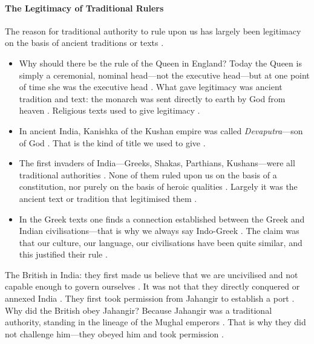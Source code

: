 \paragraph{The Legitimacy of Traditional Rulers}
The reason for traditional authority to rule upon us has largely been legitimacy on the basis of ancient traditions or texts .
\begin{itemize}
    \item Why should there be the rule of the Queen in England? Today the Queen is simply a ceremonial, nominal head---not the executive head---but at one point of time she was the executive head . What gave legitimacy was ancient tradition and text: the monarch was sent directly to earth by God from heaven . Religious texts used to give legitimacy .
    \item In ancient India, Kanishka of the Kushan empire was called \textit{Devaputra}---son of God . That is the kind of title we used to give .
    \item The first invaders of India---Greeks, Shakas, Parthians, Kushans---were all traditional authorities . None of them ruled upon us on the basis of a constitution, nor purely on the basis of heroic qualities . Largely it was the ancient text or tradition that legitimised them .
    \item In the Greek texts one finds a connection established between the Greek and Indian civilisations---that is why we always say Indo-Greek . The claim was that our culture, our language, our civilisations have been quite similar, and this justified their rule .
\end{itemize}

\begin{ExampleBox}
The British in India: they first made us believe that we are uncivilised and not capable enough to govern ourselves . It was not that they directly conquered or annexed India .
They first took permission from Jahangir to establish a port . Why did the British obey Jahangir? Because Jahangir was a traditional authority, standing in the lineage of the Mughal emperors . That is why they did not challenge him---they obeyed him and took permission .
\end{ExampleBox}

